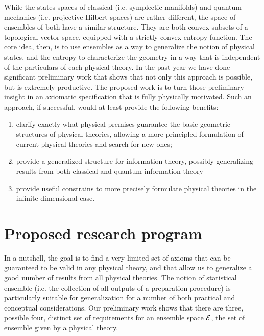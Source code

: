While the states spaces of classical (i.e. symplectic manifolds) and quantum mechanics (i.e. projective Hilbert spaces) are rather different, the space of ensembles of both have a similar structure. They are both convex subsets of a topological vector space, equipped with a strictly convex entropy function. The core idea, then, is to use ensembles as a way to generalize the notion of physical states, and the entropy to characterize the geometry in a way that is independent of the particulars of each physical theory. In the past year we have done significant preliminary work that shows that not only this approach is possible, but is extremely productive. The proposed work is to turn those preliminary insight in an axiomatic specification that is fully physically motivated. Such an approach, if successful, would at least provide the following benefits:
\begin{enumerate}
	\item clarify exactly what physical premises guarantee the basic geometric structures of physical theories, allowing a more principled formulation of current physical theories and search for new ones;
	\item provide a generalized structure for information theory, possibly generalizing results from both classical and quantum information theory
	\item provide useful constrains to more precisely formulate physical theories in the infinite dimensional case.
\end{enumerate}

\section{Proposed research program}

In a nutshell, the goal is to find a very limited set of axioms that can be guaranteed to be valid in any physical theory, and that allow us to generalize a good number of results from all physical theories. The notion of statistical ensemble (i.e. the collection of all outputs of a preparation procedure) is particularly suitable for generalization for a number of both practical and conceptual considerations. Our preliminary work shows that there are three, possible four, distinct set of requirements for an ensemble space $\mathcal{E}$, the set of ensemble given by a physical theory.

